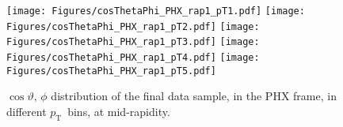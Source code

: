 \documentclass[12pt]{article}
\newcommand{\pt}{$p_{\mathrm{T}}$}
\begin{document}
%
%


\begin{figure}[htbp]
\centering
\texttt{[image: Figures/cosThetaPhi\_PHX\_rap1\_pT1.pdf]}
\texttt{[image: Figures/cosThetaPhi\_PHX\_rap1\_pT2.pdf]}
\texttt{[image: Figures/cosThetaPhi\_PHX\_rap1\_pT3.pdf]}
\texttt{[image: Figures/cosThetaPhi\_PHX\_rap1\_pT4.pdf]}
\texttt{[image: Figures/cosThetaPhi\_PHX\_rap1\_pT5.pdf]}
\caption{$\cos\vartheta,\,\phi$ distribution of the final data sample, 
	in the PHX frame, in different \pt\ bins, at mid-rapidity.}
\end{figure}
\clearpage
\end{document}
